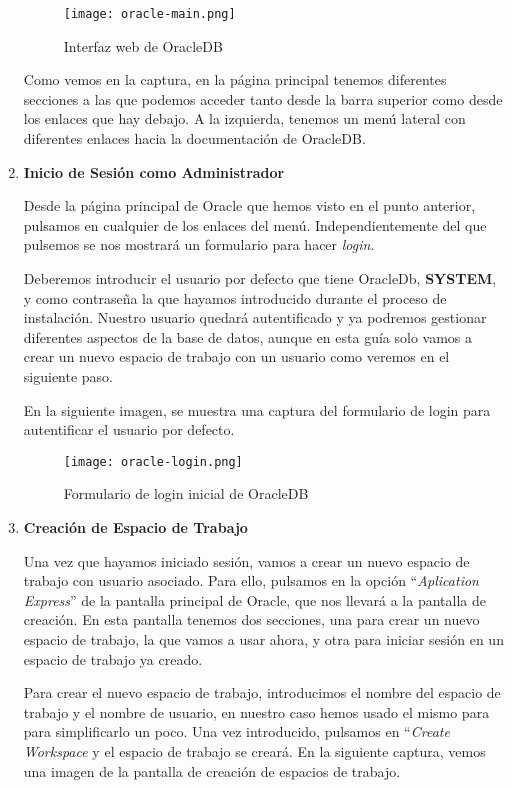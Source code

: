 \begin{enumerate}
    \begin{figure}[ht]
        \centering
        \texttt{[image: oracle-main.png]}
        \caption{Interfaz web de OracleDB}
    \end{figure}

    Como vemos en la captura, en la página principal tenemos diferentes secciones a las que podemos acceder tanto desde la barra superior como desde los enlaces que hay debajo. A la izquierda, tenemos un menú lateral con diferentes enlaces hacia la documentación de OracleDB.

    \item \textbf{Inicio de Sesión como Administrador}

    Desde la página principal de Oracle que hemos visto en el punto anterior, pulsamos en cualquier de los enlaces del menú. Independientemente del que pulsemos se nos mostrará un formulario para hacer \textit{login}.

    Deberemos introducir el usuario por defecto que tiene OracleDb, \textbf{SYSTEM}, y como contraseña la que hayamos introducido durante el proceso de instalación. Nuestro usuario quedará autentificado y ya podremos gestionar diferentes aspectos de la base de datos, aunque en esta guía solo vamos a crear un nuevo espacio de trabajo con un usuario como veremos en el siguiente paso.

    En la siguiente imagen, se muestra una captura del formulario de login para autentificar el usuario por defecto.

    \begin{figure}[ht]
        \centering
        \texttt{[image: oracle-login.png]}
        \caption{Formulario de login inicial de OracleDB}
    \end{figure}

    \item \textbf{Creación de Espacio de Trabajo}

    Una vez que hayamos iniciado sesión, vamos a crear un nuevo espacio de trabajo con usuario asociado. Para ello, pulsamos en la opción ``\textit{Aplication Express}'' de la pantalla principal de Oracle, que nos llevará a la pantalla de creación. En esta pantalla tenemos dos secciones, una para crear un nuevo espacio de trabajo, la que vamos a usar ahora, y otra para iniciar sesión en un espacio de trabajo ya creado.

    Para crear el nuevo espacio de trabajo, introducimos el nombre del espacio de trabajo y el nombre de usuario, en nuestro caso hemos usado el mismo para para simplificarlo un poco. Una vez introducido, pulsamos en ``\textit{Create Workspace} y el espacio de trabajo se creará. En la siguiente captura, vemos una imagen de la pantalla de creación de espacios de trabajo.


\end{enumerate}
